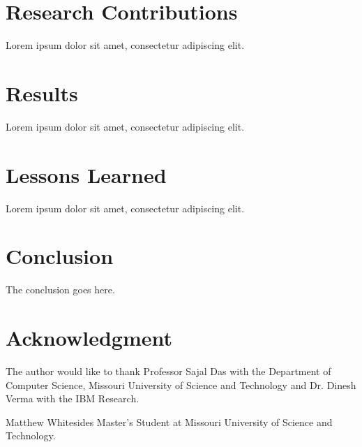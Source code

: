 \documentclass[journal,onecolumn]{IEEEtran}
\begin{document}
\section{Research Contributions}

Lorem ipsum dolor sit amet, consectetur adipiscing elit.

\section{Results}

Lorem ipsum dolor sit amet, consectetur adipiscing elit.

\section{Lessons Learned}

Lorem ipsum dolor sit amet, consectetur adipiscing elit.

\section{Conclusion}
The conclusion goes here.




\section*{Acknowledgment}
The author would like to thank Professor Sajal Das with the Department of Computer Science, Missouri University of Science and Technology and Dr. Dinesh Verma with the IBM Research.

\ifCLASSOPTIONcaptionsoff
  \newpage
\fi




\begin{IEEEbiographynophoto}{Matthew Whitesides}
  Master's Student at Missouri University of Science and Technology.
\end{IEEEbiographynophoto}

\end{document}
